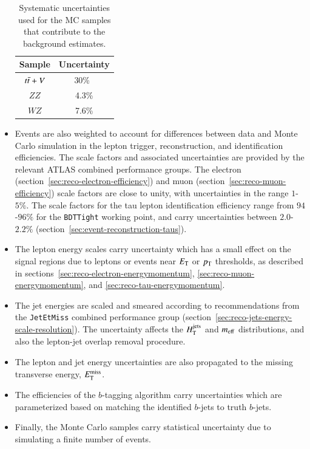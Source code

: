 \begin{itemize}
  \begin{table}
    \begin{center}
      \begin{tabular}{c c}
        \hline
        Sample     &Uncertainty\\
        \hline
        $t\bar{t}+V$ &30\%~\cite{Garzelli:2012gx,Campbell:2012en} \\
        $ZZ$       &4.3\% \\
        $WZ$       &7.6\%\\
        \hline
      \end{tabular}
      \caption{Systematic uncertainties used for the MC samples that contribute to the background estimates.}
      \label{table:model-independent-cross-section-uncertainties}
    \end{center}
  \end{table}

	\item Events are also weighted to account for differences between data and Monte Carlo simulation in the lepton trigger, reconstruction, and identification efficiencies. The scale factors and associated uncertainties are provided by the relevant ATLAS combined performance groups. The electron (section~\ref{sec:reco-electron-efficiency}) and muon (section~\ref{sec:reco-muon-efficiency}) scale factors are close to unity, with uncertainties in the range $1$-$5\%$. The scale factors for the tau lepton identification efficiency range from $94$-$96\%$ for the \texttt{BDTTight} working point, and carry uncertainties between $2.0$-$2.2\%$ (section~\ref{sec:event-reconstruction-taus}).

	\item The lepton energy scales carry uncertainty which has a small effect on the signal regions due to leptons or events near $E_{\mathrm{T}}$ or $p_{\text{T}}$ thresholds, as described in sections~\ref{sec:reco-electron-energymomentum}, \ref{sec:reco-muon-energymomentum}, and \ref{sec:reco-tau-energymomentum}.

	\item  The jet energies are scaled and smeared according to recommendations from the \texttt{JetEtMiss} combined performance group (section~\ref{sec:reco-jets-energy-scale-resolution}). The uncertainty affects the $H_{\mathrm{T}}^{\mathrm{jets}}$ and $m_{\mathrm{eff}}$ distributions, and also the lepton-jet overlap removal procedure.

	\item The lepton and jet energy uncertainties are also propagated to the missing transverse energy, $E_{\text{T}}^{\text{miss}}$. 

	\item The efficiencies of the $b$-tagging algorithm carry uncertainties which are parameterized based on matching the identified $b$-jets to truth $b$-jets.

	\item Finally, the Monte Carlo samples carry statistical uncertainty due to simulating a finite number of events. 
\end{itemize}

